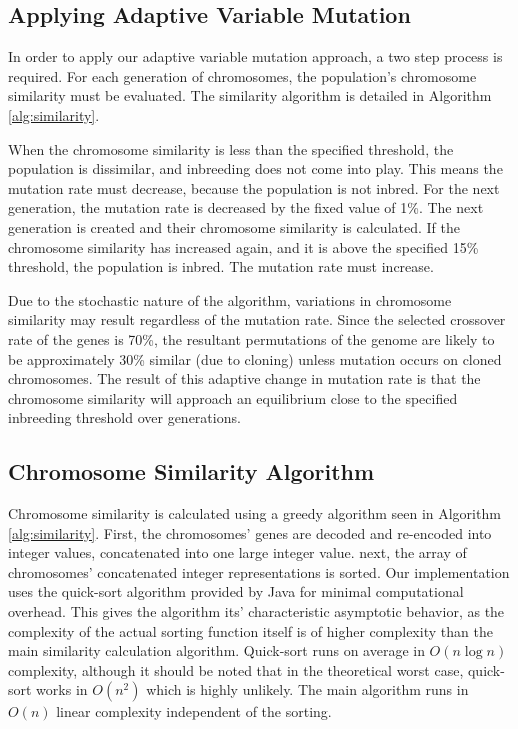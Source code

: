 \documentclass[conference]{IEEEtran}
\begin{document}
\subsection{Applying Adaptive Variable Mutation}
In order to apply our adaptive variable mutation approach, a two step process is required. For each generation of chromosomes, the population's chromosome similarity must be evaluated. The similarity algorithm is detailed in Algorithm \ref{alg:similarity}.  

When the chromosome similarity is less than the specified threshold, the population is dissimilar, and inbreeding does not come into play. This means the mutation rate must decrease, because the population is not inbred. For the next generation, the mutation rate is decreased by the fixed value of 1\%. The next generation is created and their chromosome similarity is calculated. If the chromosome similarity has increased again, and it is above the specified 15\% threshold, the population is inbred. The mutation rate must increase. 

Due to the stochastic nature of the algorithm, variations in chromosome similarity may result regardless of the mutation rate. Since the selected crossover rate of the genes is 70\%, the resultant permutations of the genome are likely to be approximately 30\% similar (due to cloning) unless mutation occurs on cloned chromosomes. The result of this adaptive change in mutation rate is that the chromosome similarity will approach an equilibrium close to the specified inbreeding threshold over generations.

\subsection{Chromosome Similarity Algorithm}
Chromosome similarity is calculated using a greedy algorithm seen in Algorithm \ref{alg:similarity}. First, the chromosomes' genes are decoded and re-encoded into integer values, concatenated into one large integer value. next, the array of chromosomes' concatenated integer representations is sorted. Our implementation uses the quick-sort algorithm provided by Java for minimal computational overhead. This gives the algorithm its' characteristic asymptotic behavior, as the complexity of the actual sorting function itself is of higher complexity than the main similarity calculation algorithm. Quick-sort runs on average in $O(n \log n)$ complexity, although it should be noted that in the theoretical worst case, quick-sort works in $O(n^2)$ which is highly unlikely. The main algorithm runs in $O(n)$ linear complexity independent of the sorting.
\end{document}
